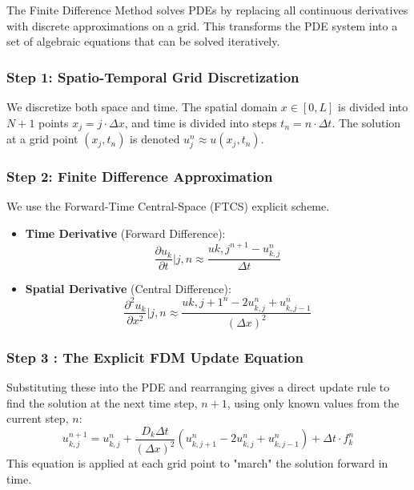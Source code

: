 \documentclass[conference]{IEEEtran}
\begin{document}
The Finite Difference Method solves PDEs by replacing all continuous derivatives with discrete approximations on a grid. This transforms the PDE system into a set of algebraic equations that can be solved iteratively.

\subsubsection{Step 1: Spatio-Temporal Grid Discretization}


We discretize both space and time. The spatial domain \( x \in [0, L] \) is divided into \( N + 1 \) points \( x_j = j \cdot \Delta x \), and time is divided into steps \( t_n = n \cdot \Delta t \). The solution at a grid point \( (x_j, t_n) \) is denoted \( u^n_j \approx u(x_j, t_n) \).

\subsubsection{Step 2: Finite Difference Approximation}


We use the Forward-Time Central-Space (FTCS) explicit scheme.
\begin{itemize}
    \item \textbf{Time Derivative} (Forward Difference):
        \begin{equation}
        \frac{\partial u_k}{\partial t}\bigg|{j,n} \approx \frac{u{k,j}^{n+1} - u_{k,j}^n}{\Delta t}
        \end{equation}
    \item \textbf{Spatial Derivative} (Central Difference):
        \begin{equation}
        \frac{\partial^2 u_k}{\partial x^2}\bigg|{j,n} \approx \frac{u{k,j+1}^n - 2u_{k,j}^n + u_{k,j-1}^n}{(\Delta x)^2}
        \end{equation}
\end{itemize}

     

\subsubsection{Step 3 : The Explicit FDM Update Equation} 


Substituting these into the PDE and rearranging gives a direct update rule to find the solution at the next time step, $n+1$, using only known values from the current step, $n$:
\begin{equation}
u_{k,j}^{n+1} = u_{k,j}^n + \frac{D_k \Delta t}{(\Delta x)^2} (u_{k,j+1}^n - 2u_{k,j}^n + u_{k,j-1}^n) + \Delta t \cdot f_k^n
\end{equation}
This equation is applied at each grid point to "march" the solution forward in time.
\end{document}
